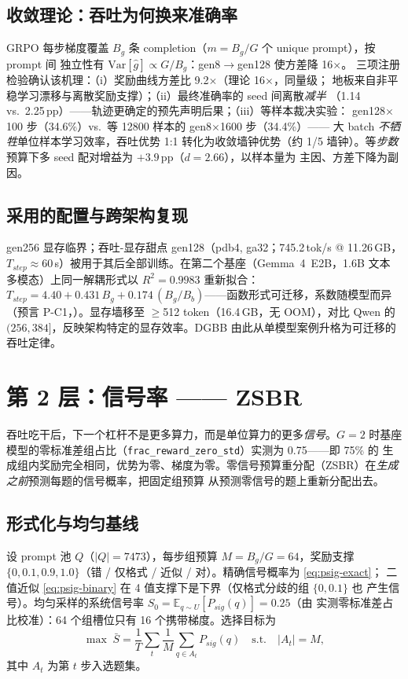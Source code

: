 \documentclass[11pt]{article}
\theoremstyle{definition}
\begin{document}
\subsection{收敛理论：吞吐为何换来准确率}\label{sec:l1-conv}
GRPO 每步梯度覆盖 $B_g$ 条 completion（$m{=}B_g/G$ 个 unique prompt），按 prompt 间
独立性有 $\mathrm{Var}[\hat g]\propto G/B_g$：gen8$\to$gen128 使方差降 16$\times$。
三项注册检验确认该机理：（i）奖励曲线方差比 9.2$\times$（理论 16$\times$，同量级；
地板来自非平稳学习漂移与离散奖励支撑）；（ii）最终准确率的 seed 间离散\emph{减半}
（1.14 vs.\ 2.25\,pp）——轨迹更确定的预先声明后果；（iii）等样本裁决实验：
gen128$\times$100 步（34.6\%）vs.\ 等 12800 样本的 gen8$\times$1600 步（34.4\%）——
大 batch \emph{不牺牲}单位样本学习效率，吞吐优势 1:1 转化为收敛墙钟优势（约 1/5
墙钟）。等\emph{步数}预算下多 seed 配对增益为 $+3.9$\,pp（$d{=}2.66$），以样本量为
主因、方差下降为副因。

\subsection{采用的配置与跨架构复现}\label{sec:l1-adopt}
gen256 显存临界；吞吐-显存甜点 gen128（pdb4, ga32；745.2\,tok/s @ 11.26\,GB，
$T_{step}\approx60$\,s）被用于其后全部训练。在第二个基座（Gemma~4~E2B，1.6B 文本
多模态）上同一解耦形式以 $R^2{=}0.9983$ 重新拟合：
$T_{step}=4.40+0.431\,B_g+0.174\,(B_g/B_b)$——函数形式可迁移，系数随模型而异（预言
P-C1，\checkmark）。显存墙移至 $\ge$512 token（16.4\,GB，无 OOM），对比 Qwen 的
$(256,384]$，反映架构特定的显存效率。DGBB 由此从单模型案例升格为可迁移的吞吐定律。


\section{第 2 层：信号率 —— ZSBR}\label{sec:l2}
吞吐吃干后，下一个杠杆不是更多算力，而是单位算力的更多\emph{信号}。$G{=}2$ 时基座
模型的零标准差组占比（\texttt{frac\_reward\_zero\_std}）实测为 0.75——即 75\% 的
生成组内奖励完全相同，优势为零、梯度为零。零信号预算重分配（ZSBR）在\emph{生成之前}预测每题的信号概率，把固定组预算
从预测零信号的题上重新分配出去。

\subsection{形式化与均匀基线}\label{sec:l2-form}
设 prompt 池 $Q$（$|Q|{=}7473$），每步组预算 $M{=}B_g/G{=}64$，奖励支撑
$\{0,0.1,0.9,1.0\}$（错 / 仅格式 / 近似 / 对）。精确信号概率为 \eqref{eq:psig-exact}；
二值近似 \eqref{eq:psig-binary} 在 4 值支撑下是下界（仅格式分歧的组 $\{0,0.1\}$ 也
产生信号）。均匀采样的系统信号率 $S_0=\mathbb{E}_{q\sim U}[P_{sig}(q)]{=}0.25$（由
实测零标准差占比校准）：64 个组槽位只有 16 个携带梯度。选择目标为
\begin{equation}\label{eq:zsbr-obj}
\max\; \bar S = \frac{1}{T}\sum_{t}\frac{1}{M}\sum_{q\in A_t} P_{sig}(q)
\quad \text{s.t.}\quad |A_t|=M,
\end{equation}
其中 $A_t$ 为第 $t$ 步入选题集。
\end{document}
